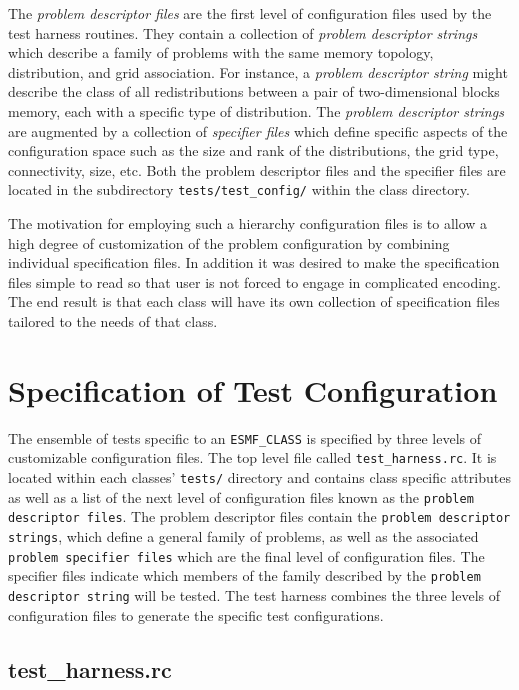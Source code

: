 \documentclass{article}
\begin{document}
The \textit{problem descriptor files} are the first level of configuration files used by the test harness routines. They contain a collection of \textit{problem descriptor strings} which describe a family of problems with the same memory topology, distribution, and grid association. For instance, a \textit{problem descriptor string} might describe the class of all redistributions between a pair of two-dimensional blocks memory, each with a specific type of distribution. The \textit{problem descriptor strings} are augmented by a collection of \textit{specifier files} which define specific aspects of the configuration space such as the size and rank of the distributions, the grid type, connectivity, size, etc. Both the problem descriptor files and the specifier files are located  in the subdirectory \texttt{tests/test\_config/} within the class directory.

The motivation for employing such a hierarchy configuration files is to allow a high degree of customization of the problem configuration by combining individual specification files. In addition it was desired to make the specification files simple to read so that user is not forced to engage in complicated encoding. The end result is that each class will have its own collection of specification files tailored to the needs of that class.

\section{Specification of Test Configuration}
The ensemble of tests specific to an \texttt{ESMF_CLASS} is specified by three levels of customizable configuration files. The top level file called \texttt{test\_harness.rc}. It is located within each classes' \texttt{tests/} directory and contains class specific attributes as well as a list of the next level of configuration files known as the \texttt{problem descriptor files}. The problem descriptor files contain the \texttt{problem descriptor strings}, which define a general family of problems, as well as the associated \texttt{problem specifier files} which are the final level of configuration files. The specifier files indicate which members of the family described by the \texttt{problem descriptor string} will be tested. The test harness combines the three levels of configuration files to generate the specific test configurations. 
 
\subsection{test_harness.rc}
\end{document}
